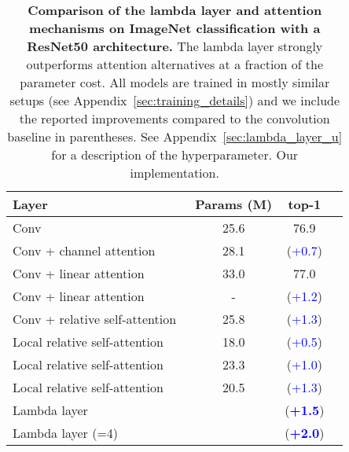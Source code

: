 \documentclass{article} \usepackage{iclr2021_conference,times}
\begin{document}
\begin{table}[ht!]
  \begin{center}
  \small
  \begin{tabular}{lccc}
    \toprule
    Layer & Params (M) & top-1 \\
    \midrule
    Conv~\citep{he2015deep} & 25.6 & 76.9 \\
    \midrule
    Conv + channel attention~\citep{hu2017squeeze} & 28.1 &  (\textcolor{blue}{+0.7}) \\
    \midrule
    Conv + linear attention~\citep{chen2018double} & 33.0 & 77.0 \\ Conv + linear attention~\citep{shen2018efficient} & - &  (\textcolor{blue}{+1.2}) \\ Conv + relative self-attention~\citep{bello2019aacn} & 25.8 &  (\textcolor{blue}{+1.3}) \\
    \midrule Local relative self-attention~\citep{ramachandran2019sasa} & 18.0 &  (\textcolor{blue}{+0.5}) \\
    Local relative self-attention~\citep{hu2019local} & 23.3 &  (\textcolor{blue}{+1.0}) \\
    Local relative self-attention~\citep{zhao2020exploring} & 20.5 &  (\textcolor{blue}{+1.3}) \\
    \midrule
    Lambda layer &  &  (\textbf{\textcolor{blue}{+1.5}}) \\
    Lambda layer (=4) &  &  (\textbf{\textcolor{blue}{+2.0}}) \\
    \bottomrule
  \end{tabular}
  \caption{\textbf{Comparison of the lambda layer and attention mechanisms on ImageNet classification with a ResNet50 architecture.}
  The lambda layer strongly outperforms attention alternatives at a fraction of the parameter cost.
  All models are trained in mostly similar setups (see Appendix~\ref{sec:training_details}) and we include the reported improvements compared to the convolution baseline in parentheses.
  See Appendix~\ref{sec:lambda_layer_u} for a description of the  hyperparameter.
   Our implementation.}
  \label{tab:resnet50}
  \vspace{-0.4cm}
  \end{center}
\end{table}

\vspace{-0.1cm}
\end{document}

